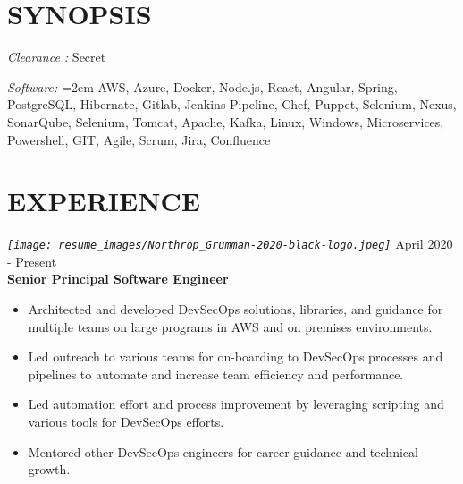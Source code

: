 \documentclass[12pt, line, margin]{res}
\begin{document}
    \begin{resume}

        \section{SYNOPSIS}
            {\sl Clearance :} Secret

            {\sl Software:}
              \hangindent=2em
              AWS, Azure, Docker, Node.js, React, Angular, Spring,\newline
              PostgreSQL, Hibernate, Gitlab, Jenkins Pipeline, Chef, Puppet,\newline
              Selenium, Nexus, SonarQube, Selenium, Tomcat, Apache, Kafka,\newline
              Linux, Windows, Microservices, Powershell, GIT, Agile, Scrum,\newline
              Jira, Confluence\newline

        \section{EXPERIENCE}
            {\sl
              \texttt{[image: resume\_images/Northrop\_Grumman-2020-black-logo.jpeg]}
            }
            \hfill April 2020 - Present \\
            \textbf{Senior Principal Software Engineer}
            \begin{itemize}  \itemsep -2pt %
              \item   Architected and developed DevSecOps solutions, libraries,
                          and guidance for multiple teams on large programs
                          in AWS and on premises environments.
              \item   Led outreach to various teams for on-boarding to DevSecOps \newline
                          processes and pipelines to automate and increase team efficiency
                          and performance.
              \item   Led automation effort and process improvement by leveraging
                          scripting and various tools for DevSecOps efforts.
              \item   Mentored other DevSecOps engineers for career guidance and
                          technical growth.
            \end{itemize}



\end{resume}
\end{document}
